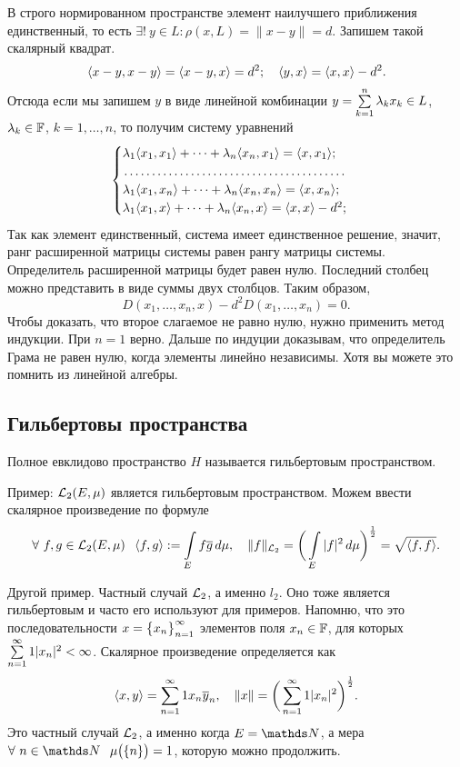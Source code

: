 \begin{Proof}
  В строго нормированном пространстве элемент наилучшего приближения единственный, то есть $\exists!\ y\in L\colon\rho(x,L) = \|x-y\|=d$. Запишем такой скалярный квадрат.
\[
  \langle x-y,x-y\rangle = \langle x-y,x\rangle = d^2;\quad \langle y,x\rangle = \langle x,x\rangle - d^2.
\]
Отсюда если мы запишем $y$ в виде линейной комбинации $y = \sum\limits_{k = 1}^{n}\lambda_kx_k\in L$, $\lambda_k\in\mathbb F$, $k=1,\dots,n$, то получим систему уравнений
\[
\begin{cases}
\l_1\la x_1,x_1\ra +\dots + \l_n\la x_n,x_1\ra = \la x,x_1\ra;\\
\dotfill\\
\l_1\la x_1,x_n\ra +\dots + \l_n\la x_n,x_n\ra = \la x,x_n\ra;\\
\l_1\la x_1,x\ra +\dots + \l_n\la x_n,x\ra = \la x,x\ra - d^2;\\
\end{cases}
\]
Так как элемент единственный, система имеет единственное решение, значит, ранг расширенной матрицы системы равен рангу матрицы системы. Определитель расширенной матрицы будет равен нулю. Последний столбец можно представить в виде суммы двух столбцов. Таким образом,
\[
  D(x_1,\dots,x_n,x)- d^2D(x_1,\dots,x_n) = 0.
\]
Чтобы доказать, что второе слагаемое не равно нулю, нужно применить метод индукции. При $n=1$ верно. Дальше по индуции доказывам, что определитель Грама не равен нулю, когда элементы линейно независимы. Хотя вы можете это помнить из линейной алгебры.
\end{Proof}

\subsection{Гильбертовы пространства}
\begin{Def}
  Полное евклидово пространство $H$ называется гильбертовым пространством.
\end{Def}
Пример: $\mathcal L_2(E,\mu)$ является гильбертовым пространством. Можем ввести скалярное произведение по формуле
\[
  \forall\ f,g\in \mathcal L_2(E,\mu)\hskip .75em plus.1em minus.08em\relax \langle f,g\rangle :=\int\limits_{E}f\overline{g}\,d\mu,\quad
                                     \|f\|_{\mathcal L_2} = \bigg(\int\limits_{E}|f|^2\,d\mu\bigg)^{\frac12} = \sqrt{\langle f,f\rangle}.
\]

Другой пример. Частный случай $\mathcal L_2$, а именно $l_2$. Оно тоже является гильбертовым и часто его используют для примеров. Напомню, что это последовательности 
$x = \big\{{x}_{n}\big\}_{n=1}^\infty$
элементов поля 
$x_n\in \mathbb F$,
для которых $\sum\limits_{{n}={1}}^\infty1|x_n|^2<\infty$. Скалярное произведение определяется как
\[
  \langle x,y\rangle = \sum\limits_{{n}={1}}^\infty1 x_n\overline{y}_n,\quad \|x\| = \bigg(\sum\limits_{{n}={1}}^\infty1|x_n|^2\bigg)^{\frac12}.
\]
Это частный случай $\mathcal L_2$, а именно когда $E=\N$, а мера $\forall\ n\in\N\pau \mu\big(\{n\}\big) = 1$, которую можно продолжить.

